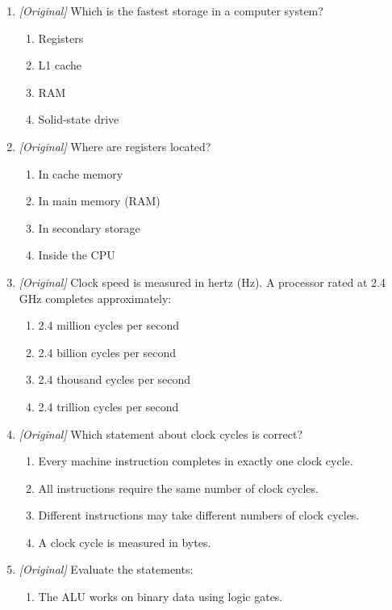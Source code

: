 \begin{enumerate}[label=\textbf{Q\arabic*.}, leftmargin=*]
\begin{enumerate}[label=\Alph*.]
  \end{enumerate}
\item \textit{[Original]} Which is the fastest storage in a computer system?
  \begin{enumerate}[label=\Alph*.]
    \item Registers
    \item L1 cache
    \item RAM
    \item Solid-state drive
  \end{enumerate}
\item \textit{[Original]} Where are registers located?
  \begin{enumerate}[label=\Alph*.]
    \item In cache memory
    \item In main memory (RAM)
    \item In secondary storage
    \item Inside the CPU
  \end{enumerate}
\item \textit{[Original]} Clock speed is measured in hertz (Hz). A processor
  rated at 2.4 GHz completes approximately:
  \begin{enumerate}[label=\Alph*.]
    \item 2.4 million cycles per second
    \item 2.4 billion cycles per second
    \item 2.4 thousand cycles per second
    \item 2.4 trillion cycles per second
  \end{enumerate}
\item \textit{[Original]} Which statement about clock cycles is correct?
  \begin{enumerate}[label=\Alph*.]
    \item Every machine instruction completes in exactly one clock cycle.
    \item All instructions require the same number of clock cycles.
    \item Different instructions may take different numbers of clock cycles.
    \item A clock cycle is measured in bytes.
  \end{enumerate}
\item \textit{[Original]} Evaluate the statements:
  \begin{enumerate}[label=\Roman*.]
    \item The ALU works on binary data using logic gates.

\end{enumerate}
\end{enumerate}
